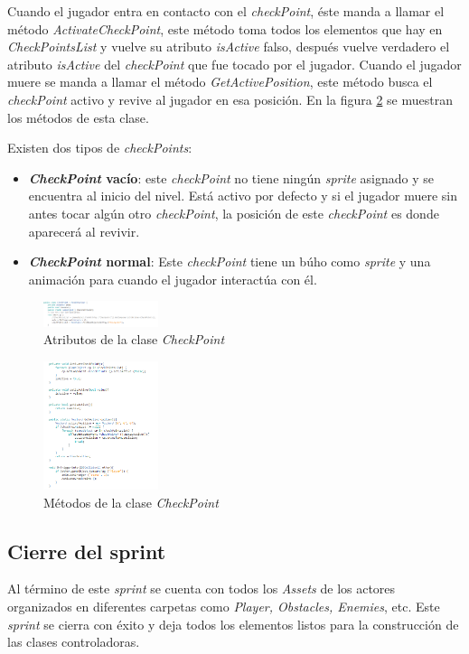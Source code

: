 Cuando el jugador entra en contacto con el \textit{checkPoint}, éste manda a
llamar el método \textit{ActivateCheckPoint}, este método toma todos los
elementos que hay en  \textit{CheckPointsList} y vuelve su atributo
\textit{isActive} falso, después vuelve verdadero el atributo \textit{isActive}
del \textit{checkPoint} que fue tocado por el jugador. Cuando el jugador muere
se manda a llamar el  método \textit{GetActivePosition}, este método busca el
\textit{checkPoint} activo y revive al jugador en esa posición. En la figura
\ref{fig:CheckMethod} se muestran los métodos de esta clase.

Existen dos tipos de \textit{checkPoints}:
    \begin{itemize}
        \item \textbf{\textit{CheckPoint} vacío}: este \textit{checkPoint} no 
        tiene ningún
        \textit{sprite} asignado y se encuentra al inicio del nivel. Está activo 
        por defecto
        y si el jugador muere sin antes tocar algún otro \textit{checkPoint}, la
        posición de este \textit{checkPoint} es donde aparecerá al revivir.
        \item \textbf{\textit{CheckPoint} normal}: Este \textit{checkPoint} tiene un
        búho como \textit{sprite} y una animación para cuando el jugador interactúa con
        él.
    \end{itemize}
    
\begin{figure}[h]
                \centering
                \includegraphics[width=0.3\textwidth]{03TrabajoRealizado/imagenes/checkpoint.png}
                \caption{Atributos de la clase \textit{CheckPoint}}
                \label{fig:CheckAtri}    
\end{figure}

\begin{figure}[h]
                \centering
                \includegraphics[width=0.3\textwidth]{03TrabajoRealizado/imagenes/checkpointmethods.png}
                \caption{Métodos de la clase \textit{CheckPoint}}
                \label{fig:CheckMethod}    
\end{figure}

\subsection{Cierre del sprint}
Al término de este \textit{sprint} se cuenta con todos los \textit{Assets} de
los actores organizados en diferentes carpetas como \textit{Player, Obstacles, Enemies},
etc. Este \textit{sprint} se cierra con éxito y deja todos los elementos listos
para la construcción de las clases controladoras.

